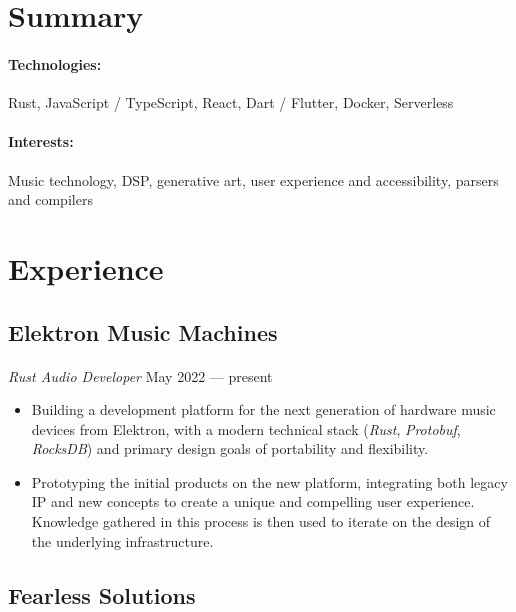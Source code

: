 \documentclass[10pt]{article}
\begin{document}

\section*{Summary}
\paragraph{Technologies:} Rust, JavaScript / TypeScript, React,
Dart / Flutter, Docker, Serverless

\paragraph{Interests:} Music technology, DSP, generative art, user
experience and accessibility, parsers and compilers

\dotfill

\section*{Experience}
\subsection*{Elektron Music Machines}
\paragraph{}
\textit{Rust Audio Developer} \hfill May 2022 --- present
\begin{itemize}
  \item Building a development platform for the next generation of
    hardware music devices from Elektron, with a modern technical stack
    (\textit{Rust}, \textit{Protobuf}, \textit{RocksDB}) and primary
    design goals of portability and flexibility.
  \item Prototyping the initial products on the new platform, integrating
    both legacy IP and new concepts to create a unique and compelling user
    experience. Knowledge gathered in this process is then used to iterate
    on the design of the underlying infrastructure.
\end{itemize}

\subsection*{Fearless Solutions}
\end{document}
